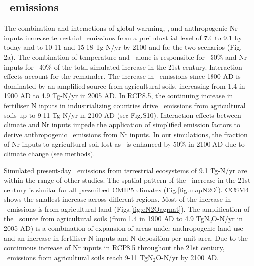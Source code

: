 \documentclass{myreport}
\begin{document}


\subsection{\nno\ emissions}
\label{sec:eN2O}



The combination and interactions of global warming, \coo , and anthropogenic Nr inputs increase terrestrial \nno\ emissions from a preindustrial level of 7.0 to 9.1 by today and to 10-11 and 15-18 Tg\nno -N/yr by 2100 and for the two scenarios (Fig. 2a). The combination of temperature and \coo\ alone is responsible for ~50\% and Nr inputs for ~40\% of the total simulated increase in the 21st century. Interaction effects account for the remainder. The increase in \nno\ emissions since 1900 AD is dominated by an amplified source from agricultural soils, increasing from 1.4 in 1900 AD to 4.9 Tg\nno -N/yr in 2005 AD. In RCP8.5, the continuing increase in fertiliser N inputs in industrializing countries drive \nno\ emissions from agricultural soils up to 9-11  Tg\nno -N/yr in 2100 AD (see Fig.S10). Interaction effects between climate and Nr inputs impede the application of simplified emission factors to derive anthropogenic \nno\ emissions from Nr inputs\cite{IPCC2006, crutzen08atmchemphys, davidson09natgeo}. In our simulations, the fraction of Nr inputs to agricultural soil lost as \nno\ is enhanced by 50\% in 2100 AD due to climate change (see methods).




Simulated present-day \nno\ emissions from terrestrial ecosystems of 9.1 Tg\nno -N/yr are within the range of other studies\cite{denman07ipcc, hirsch06gbc, sykalia11ggmm, zaehle11ngeo, xuri12nphyt}. The spatial pattern of the \nno\ increase in the 21st century is similar for all prescribed CMIP5 climates (Fig.\ref{fig:mapN2O}). CCSM4 shows the smallest increase across different regions. Most of the increase in \nno\ emissions is from agricultural land (Figs.\ref{fig:eN2Oagrnat}). The amplification of the \nno\ source from agricultural soils (from 1.4 in 1900 AD to 4.9 TgN$_2$O-N/yr in 2005 AD) is a combination of expansion of areas under anthropogenic land use and an increase in fertiliser-N inputs and N-deposition per unit area. Due to the continuous increase of Nr inputs in RCP8.5 throughout the 21st century, \nno\ emissions from agricultural soils reach 9-11 TgN$_2$O-N/yr by 2100 AD.\\
\end{document}
